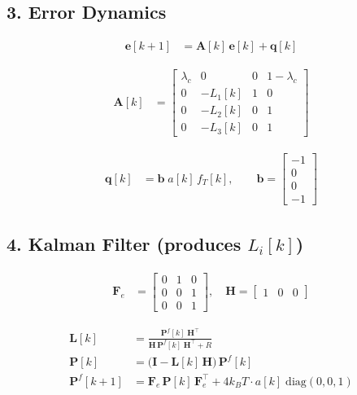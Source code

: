 \documentclass[11pt]{article}
\begin{document}
\subsection*{3. Error Dynamics}

\begin{align}
\mathbf{e}[k\!+\!1] &= \mathbf{A}[k]\,\mathbf{e}[k] + \mathbf{q}[k]
\end{align}

\begin{align}
\mathbf{A}[k] &= \begin{bmatrix}
\lambda_c & 0 & 0 & 1\!-\!\lambda_c \\[2pt]
0 & -L_1[k] & 1 & 0 \\
0 & -L_2[k] & 0 & 1 \\
0 & -L_3[k] & 0 & 1
\end{bmatrix}
\end{align}

\begin{align}
\mathbf{q}[k] &= \mathbf{b}\;a[k]\,f_T[k],\qquad
\mathbf{b} = \begin{bmatrix}-1\\0\\0\\-1\end{bmatrix}
\end{align}

\subsection*{4. Kalman Filter (produces $L_i[k]$)}

\begin{align}
\mathbf{F}_e &= \begin{bmatrix}0&1&0\\0&0&1\\0&0&1\end{bmatrix},\quad
\mathbf{H} = \begin{bmatrix}1&0&0\end{bmatrix}
\end{align}

\begin{align}
\mathbf{L}[k] &= \frac{\mathbf{P}^f\![k]\;\mathbf{H}^\top}
{\mathbf{H}\,\mathbf{P}^f\![k]\;\mathbf{H}^\top + R}
\tag{R1a}\\[6pt]
\mathbf{P}[k] &= \bigl(\mathbf{I} - \mathbf{L}[k]\,\mathbf{H}\bigr)
\,\mathbf{P}^f\![k]
\tag{R1b}\\[6pt]
\mathbf{P}^f\![k\!+\!1] &= \mathbf{F}_e\,\mathbf{P}[k]\,\mathbf{F}_e^\top
+ 4k_BT\cdot a[k]\;\mathrm{diag}(0,0,1)
\tag{R1c}
\end{align}
\end{document}
